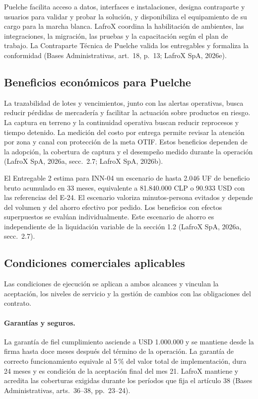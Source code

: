 Puelche facilita acceso a datos, interfaces e instalaciones, designa contraparte y usuarios para validar y probar la solución, y disponibiliza el equipamiento de su cargo para la marcha blanca. LafroX coordina la habilitación de ambientes, las integraciones, la migración, las pruebas y la capacitación según el plan de trabajo. La Contraparte Técnica de Puelche valida los entregables y formaliza la conformidad (Bases Administrativas, art.~18, p.~13; LafroX SpA, 2026e).

\subsection{Beneficios económicos para Puelche}
La trazabilidad de lotes y vencimientos, junto con las alertas operativas, busca reducir pérdidas de mercadería y facilitar la actuación sobre productos en riesgo. La captura en terreno y la continuidad operativa buscan reducir reprocesos y tiempo detenido. La medición del costo por entrega permite revisar la atención por zona y canal con protección de la meta OTIF. Estos beneficios dependen de la adopción, la cobertura de captura y el desempeño medido durante la operación (LafroX SpA, 2026a, secc.~2.7; LafroX SpA, 2026b).

El Entregable 2 estima para INN-04 un escenario de hasta 2.046 UF de beneficio bruto acumulado en 33 meses, equivalente a 81.840.000 CLP o 90.933 USD con las referencias del E-24. El escenario valoriza minutos-persona evitados y depende del volumen y del ahorro efectivo por pedido. Los beneficios con efectos superpuestos se evalúan individualmente. Este escenario de ahorro es independiente de la liquidación variable de la sección 1.2 (LafroX SpA, 2026a, secc.~2.7).

\subsection{Condiciones comerciales aplicables}
Las condiciones de ejecución se aplican a ambos alcances y vinculan la aceptación, los niveles de servicio y la gestión de cambios con las obligaciones del contrato.

\paragraph{Garantías y seguros.} La garantía de fiel cumplimiento asciende a USD 1.000.000 y se mantiene desde la firma hasta doce meses después del término de la operación. La garantía de correcto funcionamiento equivale al 5\,\% del valor total de implementación, dura 24 meses y es condición de la aceptación final del mes 21. LafroX mantiene y acredita las coberturas exigidas durante los períodos que fija el artículo 38 (Bases Administrativas, arts.~36--38, pp.~23--24).

